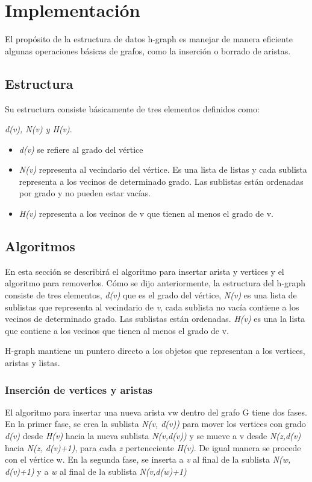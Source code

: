 \documentclass[a4paper,12pt]{article}
\begin{document}
\section{Implementaci\'on}
\label{sec3}
El prop\'osito de la estructura de datos h-graph es manejar de manera eficiente algunas operaciones b\'asicas de grafos, como la inserci\'on o borrado de aristas.


\subsection{Estructura}
Su estructura consiste b\'asicamente de tres elementos definidos como:

\textit{d(v), N(v) y H(v)}.

\begin{itemize}
\item \textit{d(v)} se refiere al grado del v\'ertice
\item \textit{N(v)} representa al vecindario del v\'ertice. Es una lista de listas y 
cada sublista representa a los vecinos de determinado grado. Las sublistas est\'an ordenadas por grado y no pueden estar vac\'ias.
\item \textit{H(v)} representa a los vecinos de v que tienen al menos el grado de v.
\end{itemize}



\subsection{Algoritmos}
En esta secci\'on se describir\'a el algoritmo para insertar arista y vertices y el algoritmo para removerlos.
C\'omo se dijo anteriormente, la estructura del h-graph consiste de tres elementos, \textit{d(v)} que es el grado del v\'ertice, \textit{N(v)} es una lista de sublistas que representa al vecindario de \textit{v}, cada sublista no vac\'ia contiene a los vecinos de determinado grado. Las sublistas est\'an ordenadas. \textit{H(v)} es una la lista que contiene a los vecinos que tienen al menos el grado de v.

H-graph mantiene un puntero directo a los objetos que representan a los vertices, aristas y listas.


\subsubsection{Inserci\'on de vertices y aristas}

El algoritmo para insertar una nueva arista vw dentro del grafo G tiene dos fases.
En la primer fase, se crea la sublista \textit{N(v, d(v))} para mover los vertices con grado \textit{d(v)} desde \textit{H(v)} hacia la nueva sublista \textit{N(v,d(v))} y se mueve a v desde \textit{N(z,d(v)} hacia \textit{N(z, d(v)+1)}, para cada \textit{z}  perteneciente \textit{H(v)}. De igual manera se procede con el v\'ertice w.
En la segunda fase, se inserta a \textit{v} al final de la sublista \textit{N(w, d(v)+1)}
y a \textit{w} al final de la sublista \textit{N(v,d(w)+1)}
\end{document}
